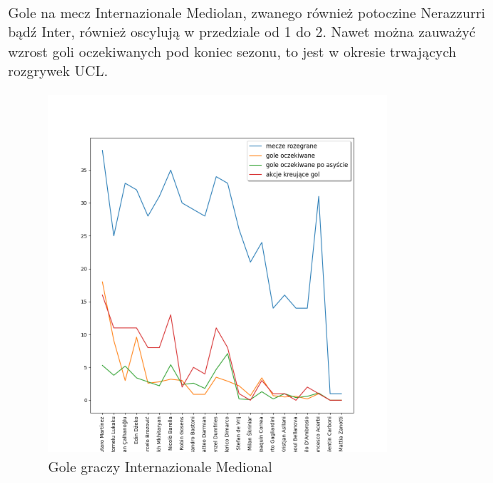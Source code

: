 \documentclass[12pt, letterpaper]{article}
\begin{document}
\paragraph{} Gole na mecz Internazionale Mediolan, zwanego również potoczine Nerazzurri bądź Inter, również oscylują w przedziale od 1 do 2. Nawet można zauważyć wzrost goli oczekiwanych pod koniec sezonu, to jest w okresie trwających rozgrywek UCL.
\pagebreak
\begin{figure}[ht]
    \centering
    \includegraphics[width=0.8\textwidth]{images/Inter_player_goals.png}
    \caption{Gole graczy Internazionale Medional}
    \label{fig:enter-label}
\end{figure}
\end{document}
